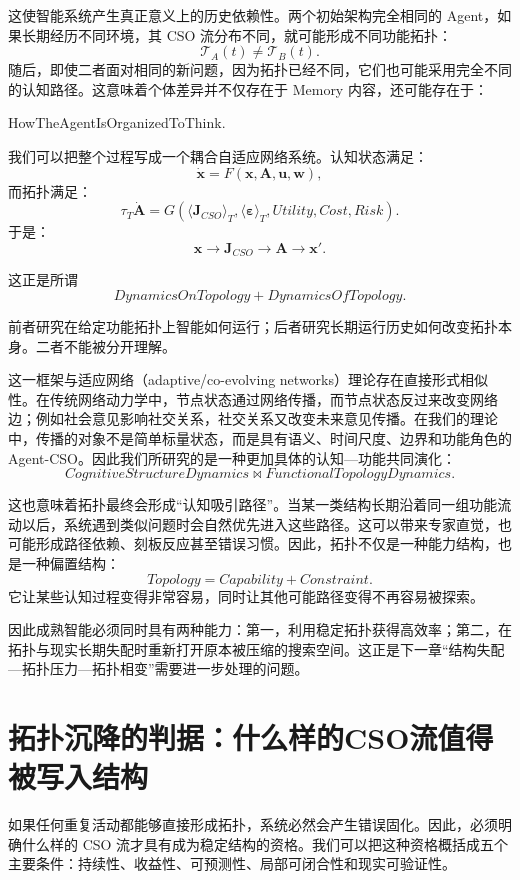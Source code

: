 这使智能系统产生真正意义上的历史依赖性。两个初始架构完全相同的 Agent，如果长期经历不同环境，其 CSO 流分布不同，就可能形成不同功能拓扑：
\[
\mathcal T_A(t)
\neq
\mathcal T_B(t).
\]
随后，即使二者面对相同的新问题，因为拓扑已经不同，它们也可能采用完全不同的认知路径。这意味着个体差异并不仅存在于 Memory 内容，还可能存在于：
\begin{statementbox}
HowTheAgentIsOrganizedToThink.
\end{statementbox}

我们可以把整个过程写成一个耦合自适应网络系统。认知状态满足：
\[
\dot{\mathbf{x}}
=
F
\left(
\mathbf{x},
\mathbf{A},
\mathbf{u},
\mathbf{w}
\right),
\]
而拓扑满足：
\[
\tau_T
\dot{\mathbf{A}}
=
G
\left(
\langle\mathbf{J}_{CSO}\rangle_T,
\langle\boldsymbol{\varepsilon}\rangle_T,
Utility,
Cost,
Risk
\right).
\]
于是：
\[
\boxed{
\mathbf{x}
\longrightarrow
\mathbf{J}_{CSO}
\longrightarrow
\mathbf{A}
\longrightarrow
\mathbf{x}'.
}
\]

这正是所谓
\[
\boxed{
DynamicsOnTopology
+
DynamicsOfTopology.
}
\]

前者研究在给定功能拓扑上智能如何运行；后者研究长期运行历史如何改变拓扑本身。二者不能被分开理解。

这一框架与适应网络（adaptive/co-evolving networks）理论存在直接形式相似性。在传统网络动力学中，节点状态通过网络传播，而节点状态反过来改变网络边；例如社会意见影响社交关系，社交关系又改变未来意见传播。在我们的理论中，传播的对象不是简单标量状态，而是具有语义、时间尺度、边界和功能角色的 Agent-CSO。因此我们所研究的是一种更加具体的认知—功能共同演化：
\[
\boxed{
CognitiveStructureDynamics
\bowtie
FunctionalTopologyDynamics.
}
\]

这也意味着拓扑最终会形成``认知吸引路径''。当某一类结构长期沿着同一组功能流动以后，系统遇到类似问题时会自然优先进入这些路径。这可以带来专家直觉，也可能形成路径依赖、刻板反应甚至错误习惯。因此，拓扑不仅是一种能力结构，也是一种偏置结构：
\[
\boxed{
Topology
=
Capability
+
Constraint.
}
\]
它让某些认知过程变得非常容易，同时让其他可能路径变得不再容易被探索。

因此成熟智能必须同时具有两种能力：第一，利用稳定拓扑获得高效率；第二，在拓扑与现实长期失配时重新打开原本被压缩的搜索空间。这正是下一章``结构失配—拓扑压力—拓扑相变''需要进一步处理的问题。


\section{拓扑沉降的判据：什么样的CSO流值得被写入结构}

如果任何重复活动都能够直接形成拓扑，系统必然会产生错误固化。因此，必须明确什么样的 CSO 流才具有成为稳定结构的资格。我们可以把这种资格概括成五个主要条件：持续性、收益性、可预测性、局部可闭合性和现实可验证性。

